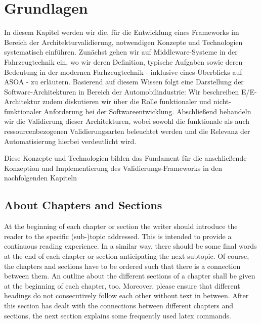 \chapter{Grundlagen}
\label{sect:basics}

In diesem Kapitel werden wir die, für die Entwicklung eines Frameworks im Bereich der Architekturvalidierung, notwendigen Konzepte und Technologien systematisch einführen. Zunächst gehen wir auf Middleware-Systeme in der Fahrzeugtechnik ein, wo wir deren Definition, typische Aufgaben sowie deren Bedeutung in der modernen Farhzeugtechnik - inklusive eines Überblicks auf ASOA - zu erläutern. Basierend auf diesem Wissen folgt eine Darstellung der Software-Architekturen in Bereich der Automobilindustrie: Wir beschreiben E/E-Architektur zudem diskutieren wir über die Rolle funktionaler und nicht-funktionaler Anforderung bei der Softwareentwicklung. Abschließend behandeln wir die Validierung dieser Architekturen, wobei sowohl die funktionale als auch ressourcenbezogenen Validierungsarten beleuchtet werden und die Relevanz der Automatisierung hierbei verdeutlicht wird.  

Diese Konzepte und Technologien bilden das Fundament für die anschließende Konzeption und Implementierung des Validierungs-Frameworks in den nachfolgenden Kapiteln







\section{About Chapters and Sections}
\label{sect:chaptsect}

At the beginning of each chapter or section the writer should introduce the reader to the specific (sub-)topic addressed.
This is intended to provide a continuous reading experience.
In a similar way, there should be some final words at the end of each chapter or section anticipating the next subtopic.
Of course, the chapters and sections have to be ordered such that there is a connection between them.
An outline about the different sections of a chapter shall be given at the beginning of each chapter, too.
Moreover, please ensure that different headings do not consecutively follow each other without text in between.
After this section has dealt with the connections between different chapters and sections, the next section explains some frequently used latex commands.

